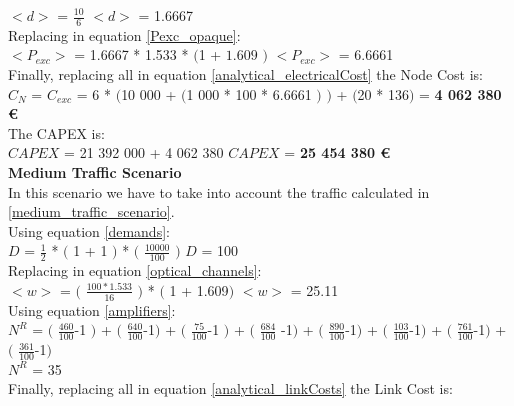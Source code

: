 $<d>$ = $\frac{10}{6}$ \qquad \qquad $<d>$ = 1.6667\\

Replacing in equation \ref{Pexc_opaque}:\\

$<P_{exc}>$ = 1.6667 * 1.533 * $($1 + $1.609$ $)$ \qquad \qquad $<P_{exc}>$ = 6.6661 \\

Finally, replacing all in equation \ref{analytical_electricalCost} the Node Cost is:\\

$C_N$ = $C_{exc}$ = 6 * $($10 000 + $($1 000 * 100 * 6.6661 $)$ $)$ + $($20 * 136$)$ = \textbf{4 062 380 \euro}\\

The CAPEX is:\\

$CAPEX$ = 21 392 000 + 4 062 380 \qquad \qquad $CAPEX$ = \textbf{25 454 380 \euro}\\

\textbf{Medium Traffic Scenario}\\

In this scenario we have to take into account the traffic calculated in \ref{medium_traffic_scenario}.\\

Using equation \ref{demands}:\\

$D$ = $\frac{1}{2}$ * $($ 1 + 1 $)$ * $($ $\frac{10000}{100}$ $)$ \qquad \qquad $D$ = 100\\

Replacing in equation \ref{optical_channels}:\\

$<w>$ = $($ $\frac{100 * 1.533}{16}$ $)$ * $($ 1 + 1.609$)$ \qquad \qquad $<w>$ = 25.11\\

Using equation \ref{amplifiers}:\\

$N^R$ = $($ $\frac{460}{100}$-1 $)$ + $($ $\frac{640}{100}$-1$)$ + $($ $\frac{75}{100}$-1 $)$ + $($ $\frac{684}{100}$ -1$)$ + $($ $\frac{890}{100}$-1$)$ + $($ $\frac{103}{100}$-1$)$ + $($ $\frac{761}{100}$-1$)$ + $($ $\frac{361}{100}$-1$)$\\

$N^R$ = 35\\

Finally, replacing all in equation \ref{analytical_linkCosts} the Link Cost is:\\


